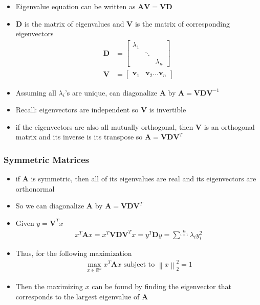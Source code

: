 \documentclass[letterpaper,12pt]{article}
\newcommand{\vect}[1]{\mathbf{#1}}
\newcommand{\matr}[1]{\mathbf{#1}}
\newcommand{\norm}[1]{\left\lVert#1\right\rVert}
\begin{document}
\begin{itemize}
 \item Eigenvalue equation can be written as $\matr{A}\matr{V} = \matr{V}\matr{D}$
 \item $\matr{D}$ is the matrix of eigenvalues and $\matr{V}$ is the matrix of corresponding eigenvectors
       \begin{align}
        \matr{D} & = \begin{bmatrix}
         \lambda_1 &        &           \\
                   & \ddots &           \\
                   &        & \lambda_n
        \end{bmatrix} \\
        \matr{V} & = \begin{bmatrix}
         \vect{v}_1 & \vect{v}_2 \dots \vect{v}_n
        \end{bmatrix}
       \end{align}
 \item Assuming all $\lambda_i$'s are unique, can diagonalize $\matr{A}$ by $\matr{A} = \matr{V} \matr{D} \matr{V}^{-1}$
 \item Recall: eigenvectors are independent so $\matr{V}$ is invertible
 \item if the eigenvectors are also all mutually orthogonal, then $\matr{V}$ is an orthogonal matrix and its inverse is its transpose
       so $\matr{A} = \matr{V} \matr{D} \matr{V}^T$
\end{itemize}

\subsubsection{Symmetric Matrices}
\begin{itemize}
 \item if $\matr{A}$ is symmetric, then all of its eigenvalues are real and its eigenvectors are orthonormal
 \item So we can diagonalize $\matr{A}$ by $\matr{A} = \matr{V} \matr{D} \matr{V}^T$
 \item Given $y = \matr{V}^T x$
       \begin{align}
        x^T \matr{A} x = x^T \matr{V} \matr{D} \matr{V}^T x = y^T \matr{D}y = \sum\limits^{n}\limits_{i=1} \lambda_i y_i^2
       \end{align}
 \item Thus, for the following maximization
       \begin{align}
        \max_{x \in \mathbb{R}^n} x^T \matr{A} x \text{ subject to } \norm{x}_2^2 = 1
       \end{align}
 \item Then the maximizing $x$ can be found by finding the eigenvector that corresponds to the largest eigenvalue of $\matr{A}$
\end{itemize}
\end{document}
